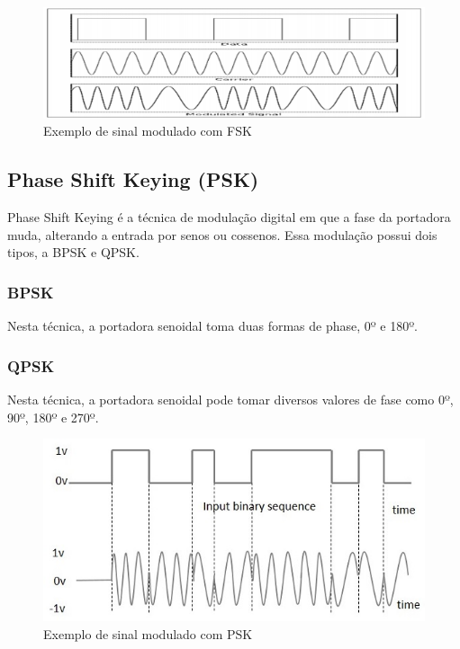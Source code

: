 \documentclass[article]{IEEEtran}
\begin{document}
\begin{figure}[hb]
\includegraphics[width=\columnwidth]{fsk.png}
\caption{Exemplo de sinal modulado com FSK}
\end{figure}

\subsection{Phase Shift Keying (PSK)}
\par Phase Shift Keying é a técnica de modulação digital em que a fase da portadora muda, alterando a entrada por senos ou cossenos. Essa modulação possui  dois tipos, a BPSK e QPSK.
\subsubsection{BPSK}
\par Nesta técnica, a portadora senoidal toma duas formas de phase, 0º e 180º.
\subsubsection{QPSK}
\par Nesta técnica, a portadora senoidal pode tomar diversos valores de fase como 0º, 90º, 180º e 270º.

\begin{figure}[h]
\includegraphics[width=\columnwidth]{psk.png}
\caption{Exemplo de sinal modulado com PSK}
\end{figure}
\end{document}
